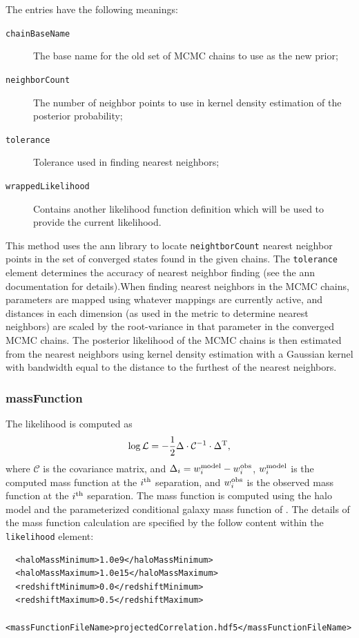 The entries have the following meanings:
\begin{description}
\item[{\tt chainBaseName}] The base name for the old set of MCMC chains to use as the new prior;
\item[{\tt neighborCount}] The number of neighbor points to use in kernel density estimation of the posterior probability;
\item[{\tt tolerance}] Tolerance used in finding nearest neighbors;
\item[{\tt wrappedLikelihood}] Contains another likelihood function definition which will be used to provide the current likelihood.
\end{description}

This method uses the \gls{ann} library to locate {\tt neightborCount} nearest neighbor points in the set of converged states found in the given chains. The {\tt tolerance} element determines the accuracy of nearest neighbor finding (see the \gls{ann} documentation for details).When finding nearest neighbors in the MCMC chains, parameters are mapped using whatever mappings are currently active, and distances in each dimension (as used in the metric to determine nearest neighbors) are scaled by the root-variance in that parameter in the converged MCMC chains. The posterior likelihood of the MCMC chains is then estimated from the nearest neighbors using kernel density estimation with a Gaussian kernel with bandwidth equal to the distance to the furthest of the nearest neighbors.

\subsubsection{massFunction}

The likelihood is computed as
\begin{equation}
\log \mathcal{L} = -{1\over2} \Delta \cdot \mathcal{C}^{-1} \cdot \Delta^{\rm T},
\end{equation}
where $\mathcal{C}$ is the covariance matrix, and $\Delta_i = w_i^{\rm model} - w_i^{\rm obs}$, $w_i^{\rm model}$ is the computed mass function at the $i^{\rm th}$ separation, and $w_i^{\rm obs}$ is the observed mass function at the $i^{\rm th}$ separation. The mass function is computed using the halo model and the parameterized conditional galaxy mass function of \cite[][see also \protect\cite{leauthaud_new_2011}; \S\protect\ref{phys:conditionalMassFunction:conditionalMassFunctionBehroozi2010}]{behroozi_comprehensive_2010}. The details of the mass function calculation are specified by the follow content within the {\tt likelihood} element:
\begin{verbatim}
  <haloMassMinimum>1.0e9</haloMassMinimum>
  <haloMassMaximum>1.0e15</haloMassMaximum>
  <redshiftMinimum>0.0</redshiftMinimum>
  <redshiftMaximum>0.5</redshiftMaximum>
  <massFunctionFileName>projectedCorrelation.hdf5</massFunctionFileName>
\end{verbatim}

